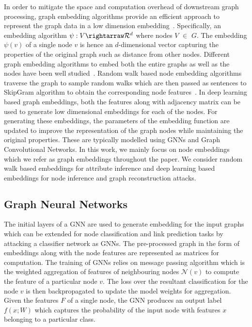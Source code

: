 In order to mitigate the space and computation overhead of downstream graph processing, graph embedding algorithms provide an efficient approach to represent the graph data in a low dimension embedding~\cite{tutorial}.
Specifically, an embedding algorithm $\psi: V \rightarraw \mathcal{R}^d$ where nodes $V$ $\in$ $G$.
The embedding $\psi(v)$ of a single node $v$ is hence an $d$-dimensional vector capturing the properties of the original graph such as distance from other nodes.
Different graph embedding algorithms to embed both the entire graphs as well as the nodes have been well studied~\cite{survey}.
Random walk based node embedding algorithms traverse the graph to sample random walks which are then passed as sentences to SkipGram algorithm to obtain the corresponding node features~\cite{node2vec,deepwalk}.
In deep learning based graph embeddings, both the features along with adjacency matrix can be used to generate low dimensional embeddings for each of the nodes.
For generating these embeddings, the parameters of the embedding function are updated to improve the representation of the graph nodes while maintaining the original properties.
These are typically modelled using GNNs and Graph Convolutional Networks.
In this work, we mainly focus on node embeddings which we refer as graph embeddings throughout the paper.
We consider random walk based embeddings for attribute inference and deep learning based embeddings for node inference and graph reconstruction attacks.

\subsection{Graph Neural Networks}

The initial layers of a GNN are used to generate embedding for the input graphs which can be extended for node classification and link prediction tasks by attacking a classifier network as GNNs.
The pre-processed graph in the form of embeddings along with the node features are represented as matrices for computation.
The training of GNNs relies on message passing algorithm which is the weighted aggregation of features of neighbouring nodes $\mathcal{N}(v)$ to compute the feature of a particular node $v$.
The loss over the resultant classification for the node $v$ is then backpropagated to update the model weights for aggregation.
Given the features $F$ of a single node, the GNN produces an output label $f(x;W)$ which captures the probability of the input node with features $x$ belonging to a particular class.

